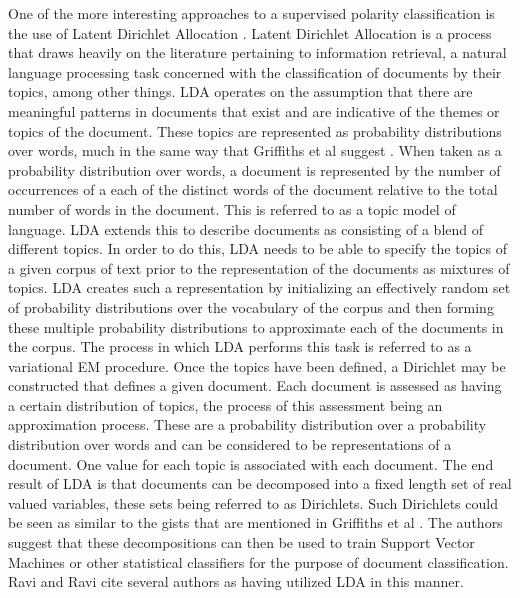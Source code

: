 \documentclass[letterpaper, 10 pt, conference]{ieeeconf}
\begin{document}
One of the more interesting approaches to a supervised polarity classification is the use of Latent Dirichlet Allocation \textcolor{gray}{\cite{Blei}}. Latent Dirichlet Allocation is a process that draws heavily on the literature pertaining to information retrieval, a natural language processing task concerned with the classification of documents by their topics, among other things. LDA operates on the assumption that there are meaningful patterns in documents that exist and are indicative of the themes or topics of the document. These topics are represented as probability distributions over words, much in the same way that Griffiths et al suggest \textcolor{gray}{\cite{Griffiths}}. When taken as a probability distribution over words, a document is represented by the number of occurrences of a each of the distinct words of the document relative to the total number of words in the document. This is referred to as a topic model of language. LDA extends this to describe documents as consisting of a blend of different topics. In order to do this, LDA needs to be able to specify the topics of a given corpus of text prior to the representation of the documents as mixtures of topics. LDA creates such a representation by initializing an effectively random set of probability distributions over the vocabulary of the corpus and then forming these multiple probability distributions to approximate each of the documents in the corpus. The process in which LDA performs this task is referred to as a variational EM procedure. Once the topics have been defined, a Dirichlet may be constructed that defines a given document. Each document is assessed as having a certain distribution of topics, the process of this assessment being an approximation process. These are a probability distribution over a probability distribution over words and can be considered to be representations of a document. One value for each topic is associated with each document. The end result of LDA is that documents can be decomposed into a fixed length set of real valued variables, these sets being referred to as Dirichlets. Such Dirichlets could be seen as similar to the gists that are mentioned in Griffiths et al \textcolor{gray}{\cite{Griffiths}}. The authors suggest that these decompositions can then be used to train Support Vector Machines or other statistical classifiers for the purpose of document classification. Ravi and Ravi cite several authors as having utilized LDA in this manner.
\end{document}
